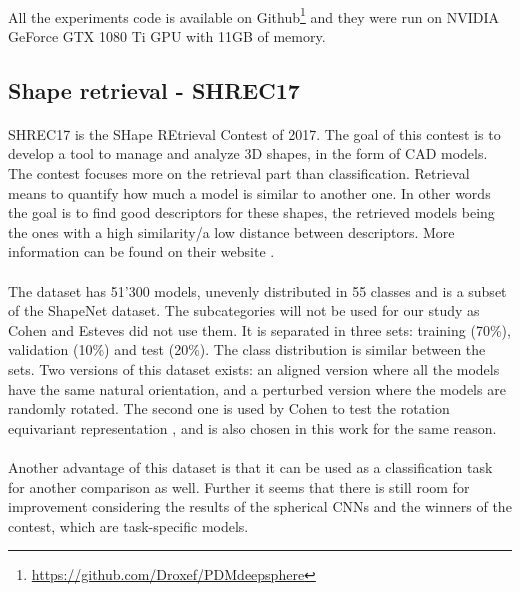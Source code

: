 \documentclass[11pt]{report}
\begin{document}
\paragraph*{}
All the experiments code is available on Github\footnote{\url{https://github.com/Droxef/PDMdeepsphere}} and they were run on NVIDIA GeForce GTX 1080 Ti GPU with 11GB of memory.

\subsection{Shape retrieval - SHREC17}\label{sec:shrec17}
\paragraph*{}
SHREC17 is the SHape REtrieval Contest of 2017. The goal of this contest is to develop a tool to manage and analyze 3D shapes, in the form of CAD models. The contest focuses more on the retrieval part than classification. Retrieval means to quantify how much a model is similar to another one. In other words the goal is to find good descriptors for these shapes, the retrieved models being the ones with a high similarity/a low distance between descriptors.
More information can be found on their website \cite{noauthor_shrec_nodate}.
\paragraph*{}
The dataset has 51'300 models, unevenly distributed in 55 classes and is a subset of the ShapeNet dataset. The subcategories will not be used for our study as Cohen and Esteves did not use them. It is separated in three sets: training (70\%), validation (10\%) and test (20\%). The class distribution is similar between the sets. Two versions of this dataset exists: an aligned version where all the models have the same natural orientation, and a perturbed version where the models are randomly rotated.
The second one is used by Cohen to test the rotation equivariant representation \cite{cohen_spherical_2018}, and is also chosen in this work for the same reason.
\paragraph*{}
Another advantage of this dataset is that it can be used as a classification task for another comparison as well. Further it seems that there is still room for improvement considering the results of the spherical CNNs and the winners of the contest, which are task-specific models.
\end{document}
